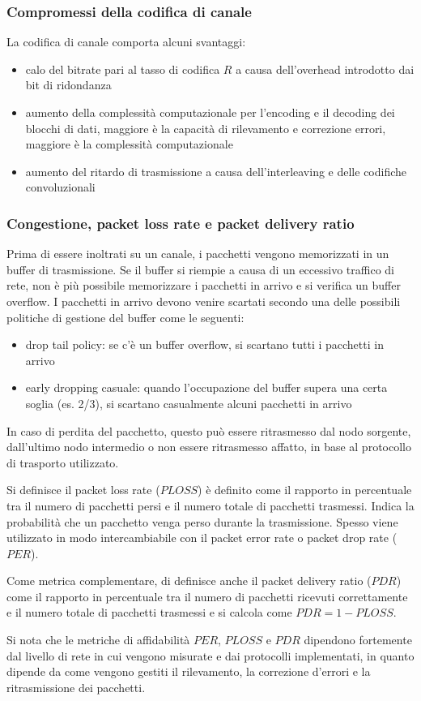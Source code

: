 \subsubsection*{Compromessi della codifica di canale}
La codifica di canale comporta alcuni svantaggi:
\begin{itemize}
	\item calo del bitrate pari al tasso di codifica \(R\) a causa dell'overhead introdotto dai bit di ridondanza
	\item aumento della complessità computazionale per l'encoding e il decoding dei blocchi di dati, maggiore è la capacità
	di rilevamento e correzione errori, maggiore è la complessità computazionale
	\item aumento del ritardo di trasmissione a causa dell'interleaving e delle codifiche convoluzionali
\end{itemize}

\subsubsection*{Congestione, packet loss rate e packet delivery ratio}
Prima di essere inoltrati su un canale, i pacchetti vengono memorizzati in un buffer di trasmissione. Se il buffer si riempie
a causa di un eccessivo traffico di rete, non è più possibile memorizzare i pacchetti in arrivo e si verifica un buffer overflow.
I pacchetti in arrivo devono venire scartati secondo una delle possibili politiche di gestione del buffer come le seguenti:
\begin{itemize}
	\item drop tail policy: se c'è un buffer overflow, si scartano tutti i pacchetti in arrivo
	\item early dropping casuale: quando l'occupazione del buffer supera una certa soglia (es. 2/3), si scartano casualmente
	alcuni pacchetti in arrivo
\end{itemize}
In caso di perdita del pacchetto, questo può essere ritrasmesso dal nodo sorgente, dall'ultimo nodo intermedio o non essere
ritrasmesso affatto, in base al protocollo di trasporto utilizzato.

Si definisce il packet loss rate (\(PLOSS\)) è definito come il rapporto in percentuale tra il numero di pacchetti persi
e il numero totale di pacchetti trasmessi. Indica la probabilità che un pacchetto venga perso durante la trasmissione.
Spesso viene utilizzato in modo intercambiabile con il packet error rate o packet drop rate (\(PER\)).

Come metrica complementare, di definisce anche il packet delivery ratio (\(PDR\)) come il rapporto in percentuale tra il
numero di pacchetti ricevuti correttamente e il numero totale di pacchetti trasmessi e si calcola come \(PDR = 1 - PLOSS\).

Si nota che le metriche di affidabilità \(PER\), \(PLOSS\) e \(PDR\) dipendono fortemente dal livello di rete in cui vengono
misurate e dai protocolli implementati, in quanto dipende da come vengono gestiti il rilevamento, la correzione d'errori e
la ritrasmissione dei pacchetti.
